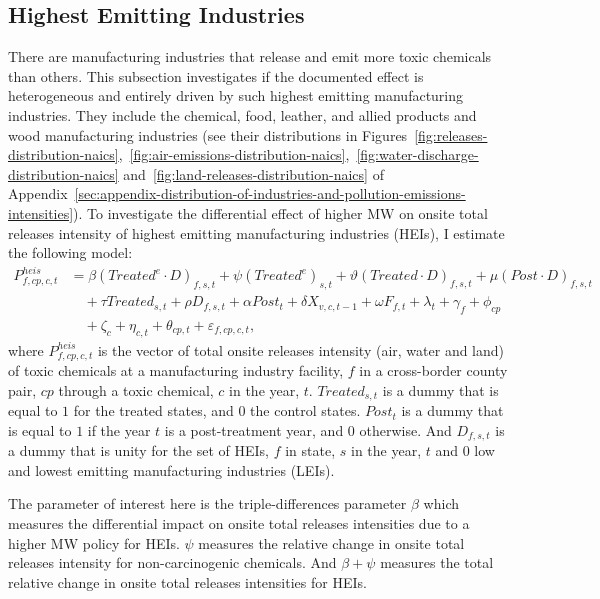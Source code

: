\documentclass[authoryear, preprint, twocolumn, 1p]{elsarticle}
\begin{document}
    \subsection{Highest Emitting Industries}\label{subsec:highest-emitting-industries}
    There are manufacturing industries that release and emit more toxic chemicals than others. This subsection investigates if the documented effect is heterogeneous and entirely driven by such highest emitting manufacturing industries. They include the chemical, food, leather, and allied products and wood manufacturing industries (see their distributions in Figures~\ref{fig:releases-distribution-naics},~\ref{fig:air-emissions-distribution-naics},~\ref{fig:water-discharge-distribution-naics} and~\ref{fig:land-releases-distribution-naics} of Appendix~\ref{sec:appendix-distribution-of-industries-and-pollution-emissions-intensities}). To investigate the differential effect of higher MW on onsite total releases intensity of highest emitting manufacturing industries (HEIs), I estimate the following model:
    \begin{align}
        P_{f,cp,c,t}^{heis} &= \beta (Treated^{e} \cdot D)_{f,s,t} + \psi (Treated^{e})_{s,t} + \vartheta (Treated \cdot D)_{f,s,t} + \mu (Post \cdot D)_{f,s,t} \nonumber \\
        &\quad + \tau Treated_{s,t} + \rho D_{f,s,t} + \alpha Post_{t} + \delta X_{v,c,t-1} + \omega F_{f,t} + \lambda_{t} + \gamma_{f} + \phi_{cp} \nonumber \\
        &\quad + \zeta_{c} + \eta_{c,t} + \theta_{cp,t} + \varepsilon_{f,cp,c,t},\label{eq:heterogeneous-onsite-releases-intensity-heis}
    \end{align}
    where $P_{f,cp,c,t}^{heis}$ is the vector of total onsite releases intensity (air, water and land) of toxic chemicals at a manufacturing industry facility, $f$ in a cross-border county pair, $cp$ through a toxic chemical, $c$ in the year, $t$. $Treated_{s,t}$ is a dummy that is equal to $1$ for the treated states, and $0$ the control states. $Post_{t}$ is a dummy that is equal to $1$ if the year $t$ is a post-treatment year, and $0$ otherwise. And $D_{f,s,t}$ is a dummy that is unity for the set of HEIs, $f$ in state, $s$ in the year, $t$ and $0$ low and lowest emitting manufacturing industries (LEIs).
    

    The parameter of interest here is the triple-differences parameter $\beta$ which measures the differential impact on onsite total releases intensities due to a higher MW policy for HEIs. $\psi$ measures the relative change in onsite total releases intensity for non-carcinogenic chemicals. And $\beta + \psi$ measures the total relative change in onsite total releases intensities for HEIs.
\end{document}
